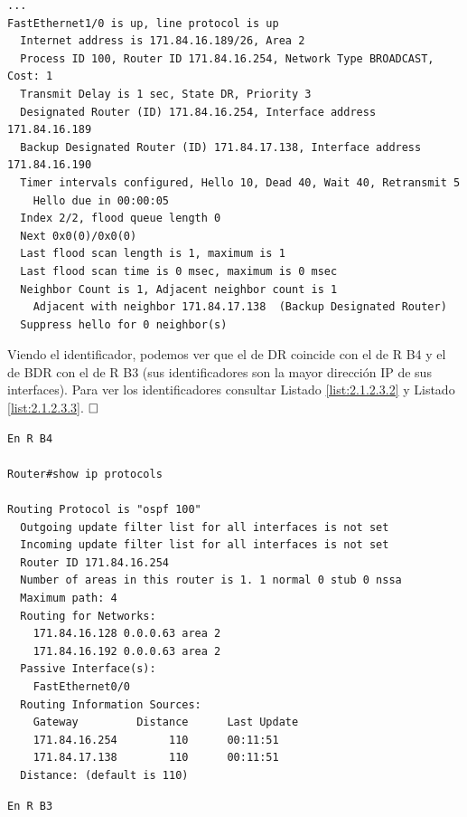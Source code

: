 \documentclass[twoside, 11pt]{article}
\begin{document}
\begin{enumerate}
\begin{center}
\begin{verbatim}
...
FastEthernet1/0 is up, line protocol is up
  Internet address is 171.84.16.189/26, Area 2
  Process ID 100, Router ID 171.84.16.254, Network Type BROADCAST, Cost: 1
  Transmit Delay is 1 sec, State DR, Priority 3
  Designated Router (ID) 171.84.16.254, Interface address 171.84.16.189
  Backup Designated Router (ID) 171.84.17.138, Interface address 171.84.16.190
  Timer intervals configured, Hello 10, Dead 40, Wait 40, Retransmit 5
    Hello due in 00:00:05
  Index 2/2, flood queue length 0
  Next 0x0(0)/0x0(0)
  Last flood scan length is 1, maximum is 1
  Last flood scan time is 0 msec, maximum is 0 msec
  Neighbor Count is 1, Adjacent neighbor count is 1
    Adjacent with neighbor 171.84.17.138  (Backup Designated Router)
  Suppress hello for 0 neighbor(s)
\end{verbatim}
\label{list:2.1.2.3.1}
\end{center}

Viendo el identificador, podemos ver que el de DR coincide con el de R B4 y el de BDR con el de R B3 (sus identificadores son la mayor dirección IP de sus interfaces). Para ver los identificadores consultar Listado \ref{list:2.1.2.3.2} y Listado \ref{list:2.1.2.3.3}. $\hfill\square$

\begin{center}
\begin{verbatim}
En R B4

Router#show ip protocols 

Routing Protocol is "ospf 100"
  Outgoing update filter list for all interfaces is not set 
  Incoming update filter list for all interfaces is not set 
  Router ID 171.84.16.254
  Number of areas in this router is 1. 1 normal 0 stub 0 nssa
  Maximum path: 4
  Routing for Networks:
    171.84.16.128 0.0.0.63 area 2
    171.84.16.192 0.0.0.63 area 2
  Passive Interface(s): 
    FastEthernet0/0
  Routing Information Sources:  
    Gateway         Distance      Last Update 
    171.84.16.254        110      00:11:51
    171.84.17.138        110      00:11:51
  Distance: (default is 110)
\end{verbatim}
\label{list:2.1.2.3.2}

\begin{verbatim}
En R B3


\end{verbatim}
\end{center}
\end{enumerate}
\end{document}
